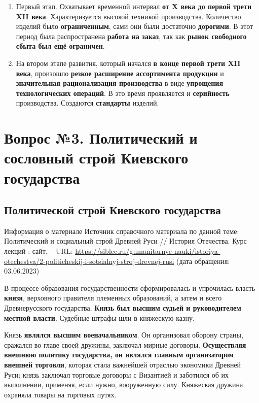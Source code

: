 \documentclass{article}
\begin{document}
\begin{enumerate}
    \item Первый этап. Охватывает временной интервал \textbf{от X века до первой трети XII века}. Характеризуется высокой техникой производства. Количество изделий было \textbf{ограниченным}, сами они были достаточно \textbf{дорогими}. В этот период была распространена \textbf{работа на заказ}, так как \textbf{рынок свободного сбыта был ещё ограничен}.
    \item На втором этапе развития, который начался \textbf{в конце первой трети XII века}, произошло \textbf{резкое расширение ассортимента продукции} и \textbf{значительная рационализация производства} в виде \textbf{упрощения технологических операций}. В это время проявляется и \textbf{серийность} производства. Создаются \textbf{стандарты} изделий.
\end{enumerate}

\pagebreak
\section{Вопрос №3. Политический и сословный строй Киевского государства}

\subsection{Политической строй Киевского государства}

\begin{bclogo}[logo=\bcinfo, couleurBarre=orange, noborder=true, couleur=white]{Информация о материале}
    Источник справочного материала по данной теме: Политический и социальный строй Древней Руси // История Отечества. Курс лекций : сайт. – URL: \href{https://siblec.ru/gumanitarnye-nauki/istoriya-otechestva/2-politicheskij-i-sotsialnyj-stroj-drevnej-rusi}{https://siblec.ru/gumanitarnye-nauki/istoriya-otechestva/2-politicheskij-i-sotsialnyj-stroj-drevnej-rusi} (дата обращения: 03.06.2023)
\end{bclogo}

В процессе образования государственности сформировалась и упрочилась власть \textbf{князя}, верховного правителя племенных образований, а затем и всего Древнерусского государства. \textbf{Князь был высшим судьей и руководителем местной власти}. Судебные штрафы шли в княжескую казну.

Князь \textbf{являлся высшим военачальником}. Он организовал оборону страны, сражался во главе своей дружины, заключал мирные договоры. \textbf{Осуществляя внешнюю политику государства, он являлся главным организатором внешней торговли}, которая стала важнейшей отраслью экономики Древней Руси: князь заключал торговые договоры с Византией и заботился об их выполнении, применяя, если нужно, вооруженную силу. Княжеская дружина охраняла товары на торговых путях.
\end{document}
